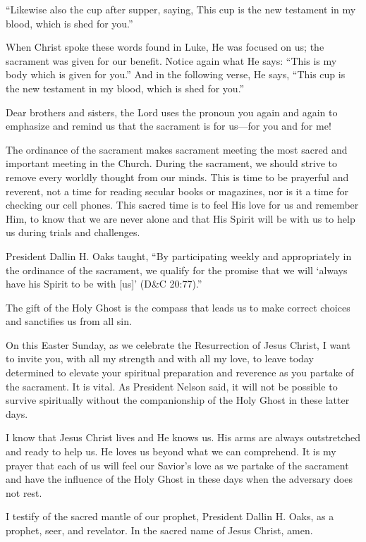 \documentclass[letterpaper, 11pt]{report}
\begin{document}
“Likewise also the cup after supper, saying, This cup is the new testament in my blood, which is shed for you.”

When Christ spoke these words found in Luke, He was focused on us; the sacrament was given for our benefit. Notice again what He says: “This is my body⁠ which is given for you.” And in the following verse, He says, “This cup is the new testament in my blood, which is shed for you.”

Dear brothers and sisters, the Lord uses the pronoun you again and again to emphasize and remind us that the sacrament is for us—for you and for me!

The ordinance of the sacrament makes sacrament meeting the most sacred and important meeting in the Church. During the sacrament, we should strive to remove every worldly thought from our minds. This is time to be prayerful and reverent, not a time for reading secular books or magazines, nor is it a time for checking our cell phones. This sacred time is to feel His love for us and remember Him, to know that we are never alone and that His Spirit will be with us to help us during trials and challenges.

President Dallin H. Oaks taught, “By participating weekly and appropriately in the ordinance of the sacrament, we qualify for the promise that we will ‘always have his Spirit to be with [us]’ (D\&C 20:77).”

The gift of the Holy Ghost is the compass that leads us to make correct choices and sanctifies us from all sin.

On this Easter Sunday, as we celebrate the Resurrection of Jesus Christ, I want to invite you, with all my strength and with all my love, to leave today determined to elevate your spiritual preparation and reverence as you partake of the sacrament. It is vital. As President Nelson said, it will not be possible to survive spiritually without the companionship of the Holy Ghost in these latter days.

I know that Jesus Christ lives and He knows us. His arms are always outstretched and ready to help us. He loves us beyond what we can comprehend. It is my prayer that each of us will feel our Savior’s love as we partake of the sacrament and have the influence of the Holy Ghost in these days when the adversary does not rest.

I testify of the sacred mantle of our prophet, President Dallin H. Oaks, as a prophet, seer, and revelator. In the sacred name of Jesus Christ, amen.
\end{document}
